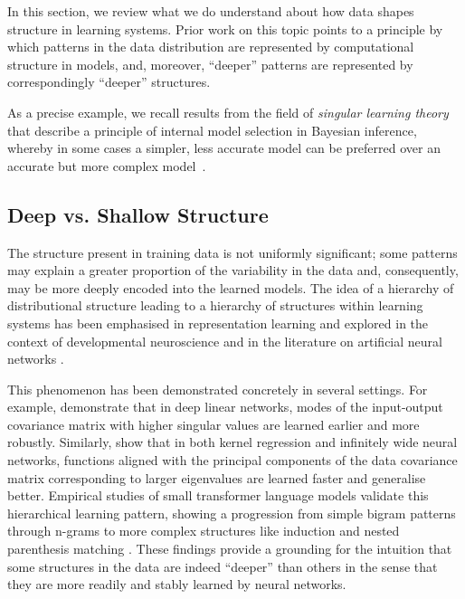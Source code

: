 In this section, we review what we do understand about how data shapes structure in learning systems.
%
Prior work on this topic points to a principle by which patterns in the data distribution are represented by computational structure in models, and, moreover, ``deeper'' patterns are represented by correspondingly ``deeper'' structures.

As a precise example, we recall results from the field of \emph{singular learning theory} that describe a principle of internal model selection in Bayesian inference, whereby in some cases a simpler, less accurate model can be preferred over an accurate but more complex model~\citep[\S 7.6]{watanabe2009algebraic}.

\subsection{Deep vs. Shallow Structure}


The structure present in training data is not uniformly significant; some patterns may explain a greater proportion of the variability in the data and, consequently, may be more deeply encoded into the learned models. 
%
The idea of a hierarchy of distributional structure leading to a hierarchy of structures within learning systems has been emphasised in representation learning \citep{bengio2013representation} and explored in the context of developmental neuroscience
\citep{johnson2015developmental,kiebel2011free} and in the literature on artificial neural networks \citep{achille2018critical,abbe2023sgd}.

This phenomenon has been demonstrated concretely in several settings. For example, \citet{saxe2019mathematical} demonstrate that in deep linear networks, modes of the input-output covariance matrix with higher singular values are learned earlier and more robustly. Similarly, \citet{canatar2021spectral} show that in both kernel regression and infinitely wide neural networks, functions aligned with the principal components of the data covariance matrix corresponding to larger eigenvalues are learned faster and generalise better. Empirical studies of small transformer language models validate this hierarchical learning pattern, showing a progression from simple bigram patterns through n-grams to more complex structures like induction and nested parenthesis matching \citep{hoogland2024developmental,wang2024differentiation}. 
% 
These findings provide a grounding for the intuition that some structures in the data are indeed ``deeper'' than others in the sense that they are more readily and stably learned by neural networks.


